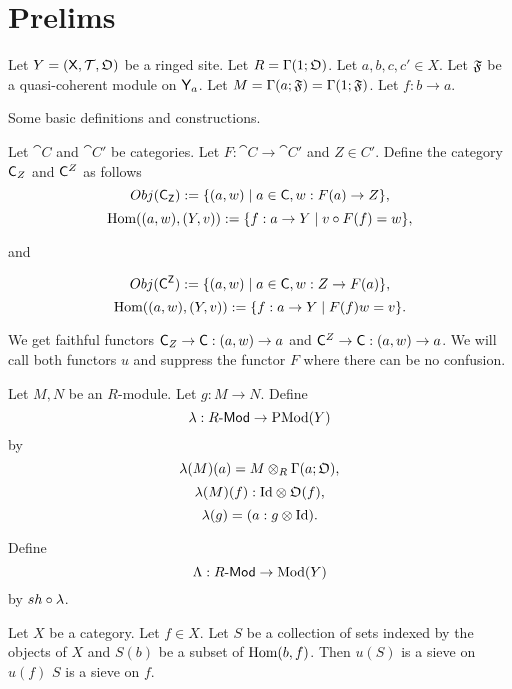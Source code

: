 



\section*{Prelims}

Let $Y = ({\mathsf{X}}, {\mathcal{T}}, {\mathfrak{O}})$ be a ringed site.
Let $R = \globalsections{O}$. Let $a,b,c,c'\in X$.
Let $\mathfrak{F}$ be a quasi-coherent module on ${\mathsf{Y}}_{a}$.
Let $M = \sections{a}{F} = \globalsections{F}$.
Let $f:b \rightarrow a$.

Some basic definitions and constructions.

\begin{definition}
Let $\cat{C}$ and $\cat{C'}$ be categories. Let $F:\cat{C}\rightarrow \cat{C'}$ and $Z\in C'$. 
Define the category ${\mathsf{C}}_{Z}$ and ${\mathsf{C}}^{Z}$ as follows
\[Obj({\mathsf{{\mathsf{C}}_{Z}}}) := \{(a,w) \mid a\in {\ensuremath{\mathsf{C}}}, w:F(a)\rightarrow Z\},\]
\[\mbox{Hom}((a,w),(Y,v)) := \{f:a\rightarrow Y \mid v\circ F(f) = w  \},\]

and

\[Obj({\mathsf{{\mathsf{C}}^{Z}}}) := \{(a,w) \mid a\in {\ensuremath{\mathsf{C}}}, w:Z\rightarrow F(a)\},\]
\[\mbox{Hom}((a,w),(Y,v)) := \{f:a\rightarrow Y \mid F(f)w = v  \}.\]

We get faithful functors 
${\mathsf{C}}_{Z} \rightarrow {\ensuremath{\mathsf{C}}}: (a,w)\rightarrow a$ and 
${\mathsf{C}}^{Z} \rightarrow {\ensuremath{\mathsf{C}}}: (a,w)\rightarrow a$.
We will call both functors $u$ and suppress the functor $F$ where there can be no confusion.
\end{definition}


\begin{definition}
Let $M,N$ be an $R$-module.
Let $g:M \rightarrow N$.
Define 
\[\pstilde: \modules{R} \rightarrow \pshmodules{Y}\]
by
\[\pstilde(M)(a) = M \tensor_R \sections{a}{O} ,\]
\[\pstilde(M)(f): \id \tensor \sheaf{O}(f) ,\]
\[\pstilde(g) = (a: g \tensor \id ).\]
\end{definition}

\begin{definition}
Define
\[\stilde: \modules{R} \rightarrow \shmodules{Y}\]
by
$\sheafify \circ \pstilde$.
\end{definition}



\begin{lemma}
Let $X$ be a category.
Let $f\in X$.
Let $S$ be a collection of sets indexed by the objects of $X$
and $S(b)$ be a subset of $\mbox{Hom}(b,f)$.
Then $u(S)$ is a sieve on $u(f)$ \iff $S$ is a sieve on $f$.
\end{lemma}

